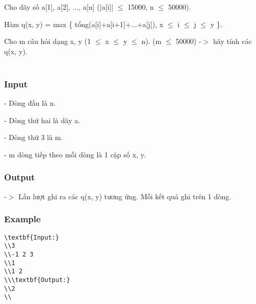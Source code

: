 



   Cho dãy số a[1], a[2], ..., a[n] (|a[i]|  $\le$  15000, n  $\le$  50000).  

   Hàm q(x, y) = max \{ tổng(a[i]+a[i+1]+...+a[j]), x  $\le$  i  $\le$  j  $\le$  y \}.  

   Cho m câu hỏi dạng x, y (1  $\le$  x  $\le$  y  $\le$  n). (m  $\le$  50000) -$>$ hãy tính các q(x, y).   
\\
\\

\subsubsection{   Input  }

   - Dòng đầu là n.  

   - Dòng thứ hai là dãy a.  

   - Dòng thứ 3 là m.  

   - m dòng tiếp theo mỗi dòng là 1 cặp số x, y.  

\subsubsection{   Output  }

   -$>$ Lần lượt ghi ra các q(x, y) tương ứng. Mỗi kết quả ghi trên 1 dòng.  

\subsubsection{   Example  }
\begin{verbatim}
\textbf{Input:}
\\3
\\-1 2 3
\\1
\\1 2
\\\textbf{Output:}
\\2
\\\end{verbatim}
